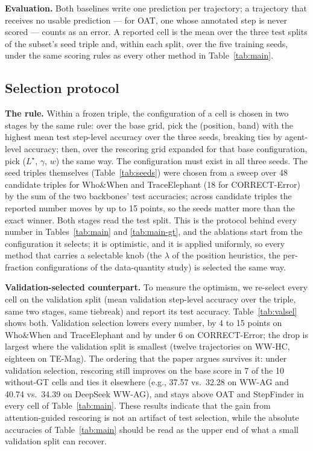 \textbf{Evaluation.}
Both baselines write one prediction per trajectory; a trajectory that receives
no usable prediction --- for OAT, one whose annotated step is never scored ---
counts as an error. A reported cell is the mean over the three test splits of
the subset's seed triple and, within each split, over the five training seeds,
under the same scoring rules as every other method in Table~\ref{tab:main}.


\subsection{Selection protocol}
\label{app:selection}

\textbf{The rule.}
Within a frozen triple, the configuration of a cell is chosen in two stages by the
same rule: over the base grid, pick the (position, band) with the highest mean test
step-level accuracy over the three seeds, breaking ties by agent-level accuracy;
then, over the rescoring grid expanded for that base configuration, pick
($L^\star$, $\gamma$, $w$) the same way. The configuration must exist in all three
seeds. The seed triples themselves (Table~\ref{tab:seeds}) were chosen from a sweep
over 48 candidate triples for Who\&When and TraceElephant (18 for CORRECT-Error) by
the sum of the two backbones' test accuracies; across candidate triples the reported
number moves by up to 15 points, so the seeds matter more than the exact winner.
Both stages read the test split. This is the protocol behind every number in
Tables~\ref{tab:main} and \ref{tab:main-gt}, and the ablations start from the
configuration it selects; it is optimistic, and it is applied uniformly, so every
method that carries a selectable knob (the $\lambda$ of the position heuristics, the
per-fraction configurations of the data-quantity study) is selected the same way.

\textbf{Validation-selected counterpart.}
To measure the optimism, we re-select every cell on the validation split (mean
validation step-level accuracy over the triple, same two stages, same tiebreak) and
report its test accuracy. Table~\ref{tab:valsel} shows both. Validation selection
lowers every \soap{} number, by 4 to 15 points on Who\&When and TraceElephant and by
under 6 on CORRECT-Error; the drop is largest where the validation split is smallest
(twelve trajectories on WW-HC, eighteen on TE-Mag). The ordering that the paper
argues survives it: under validation selection, rescoring still improves on the
base score in 7 of the 10 without-GT cells and ties it elsewhere (e.g., 37.57 vs.\
32.28 on WW-AG and 40.74 vs.\ 34.39 on DeepSeek WW-AG), and \soap{} stays above OAT
and StepFinder in every cell of Table~\ref{tab:main}. These results indicate that the
gain from attention-guided rescoring is not an artifact of test selection, while the
absolute accuracies of Table~\ref{tab:main} should be read as the upper end of what
a small validation split can recover.

